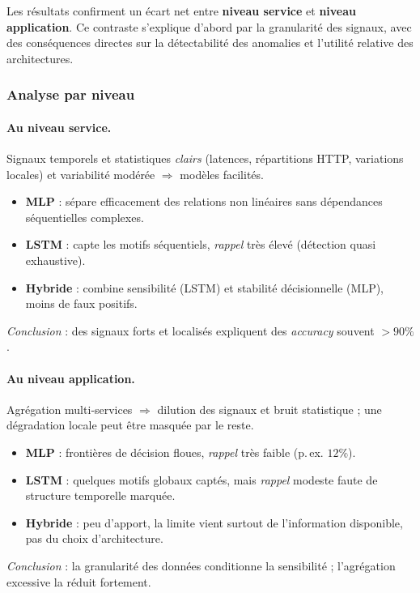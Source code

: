 \documentclass[conference]{IEEEtran}
\begin{document}
Les résultats confirment un écart net entre \textbf{niveau service} et \textbf{niveau application}. Ce contraste s’explique d’abord par la granularité des signaux, avec des conséquences directes sur la détectabilité des anomalies et l’utilité relative des architectures.

\subsubsection*{Analyse par niveau}

\paragraph{Au niveau service.}
Signaux temporels et statistiques \emph{clairs} (latences, répartitions HTTP, variations locales) et variabilité modérée $\Rightarrow$ modèles facilités.
\begin{itemize}
  \item \textbf{MLP} : sépare efficacement des relations non linéaires sans dépendances séquentielles complexes.
  \item \textbf{LSTM} : capte les motifs séquentiels, \textit{rappel} très élevé (détection quasi exhaustive).
  \item \textbf{Hybride} : combine sensibilité (LSTM) et stabilité décisionnelle (MLP), moins de faux positifs.
\end{itemize}
\emph{Conclusion} : des signaux forts et localisés expliquent des \textit{accuracy} souvent $>90\%$.

\paragraph{Au niveau application.}
Agrégation multi‐services $\Rightarrow$ dilution des signaux et bruit statistique ; une dégradation locale peut être masquée par le reste.
\begin{itemize}
  \item \textbf{MLP} : frontières de décision floues, \textit{rappel} très faible (p.\,ex. $12\%$).
  \item \textbf{LSTM} : quelques motifs globaux captés, mais \textit{rappel} modeste faute de structure temporelle marquée.
  \item \textbf{Hybride} : peu d’apport, la limite vient surtout de l’information disponible, pas du choix d’architecture.
\end{itemize}
\emph{Conclusion} : la granularité des données conditionne la sensibilité ; l’agrégation excessive la réduit fortement.
\end{document}
